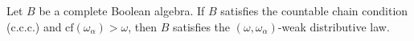 Let $B$ be a complete Boolean algebra. If $B$ satisfies the countable chain condition (c.c.c.) and $\mathrm{cf}(\omega_{\alpha}) > \omega$, then $B$ satisfies the $(\omega, \omega_{\alpha})$-weak distributive law.
